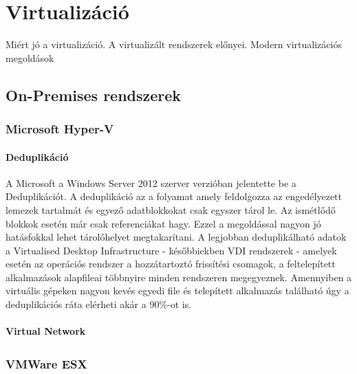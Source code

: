 \documentclass[12pt,oneside,justify]{book}
\begin{document}
 




\tableofcontents

\chapter{Virtualizáció}
\noindent Miért jó a virtualizáció. A virtualizált rendszerek előnyei. Modern virtualizációs megoldások

\section{On-Premises rendszerek}

\subsection{Microsoft Hyper-V\texttrademark}

\subsubsection{Deduplikáció}
\noindent
A Microsoft a Windows Server 2012 szerver verzióban jelentette be a Deduplikációt. A deduplikáció az a folyamat amely feldolgozza az engedélyezett lemezek tartalmát és egyező adatblokkokat csak egyszer tárol le. Az ismétlődő blokkok esetén már csak referenciákat hagy. Ezzel a megoldással nagyon jó hatásfokkal lehet tárolóhelyet megtakarítani. A legjobban deduplikálható adatok a Virtualised Desktop Infrastructure - későbbiekben VDI rendszerek - amelyek esetén az operációs rendszer a hozzátartoztó frissítési csomagok, a feltelepített alkalmazások alapfileai többnyire minden rendszeren megegyeznek. Amennyiben a virtuális gépeken nagyon kevés egyedi file és telepített alkalmazás található úgy a deduplikációs ráta elérheti akár a 90\%-ot is.


\subsubsection{Virtual Network}


\subsection{VMWare ESX \textsuperscript{\textregistered}}
\noindent
\end{document}
